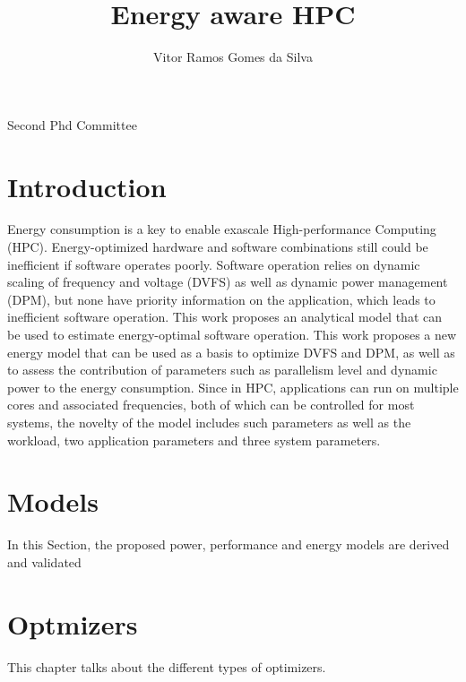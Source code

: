 \documentclass{report}
\begin{document}
\title{Energy aware HPC}
\author{Vitor Ramos Gomes da Silva}
 
\beforepreface
{}
Second Phd Committee
\afterpreface

\chapter{Introduction}
Energy consumption is a key to enable exascale High-performance Computing (HPC). Energy-optimized hardware and software combinations still could be inefficient if software operates poorly. 
Software operation relies on dynamic scaling of frequency and voltage (DVFS) as well as dynamic power management (DPM), but none have priority information on the application, which leads to inefficient software operation. This work proposes an analytical model that can be used to estimate energy-optimal software operation. 
This work proposes a new energy model that can be used as a basis to optimize DVFS and DPM, as well as to assess the contribution of parameters such as parallelism level and dynamic power to the energy consumption.
Since in HPC, applications can run on multiple cores and associated frequencies, both of which can be controlled for most systems, the novelty of the model includes such parameters as well as the workload, two application parameters and three system parameters.


%


\chapter{Models}
In this Section, the proposed power, performance and energy models are derived and validated



\chapter{Optmizers}
This chapter talks about the different types of optimizers.

\end{document}
